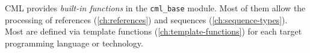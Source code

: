 CML provides \emph{built-in functions} in the \verb|cml_base| module.
Most of them allow the processing of
references (\ref{ch:references}) and sequences (\ref{ch:sequence-types}).
Most are defined via template functions (\ref{ch:template-functions})
for each target programming language or technology.
